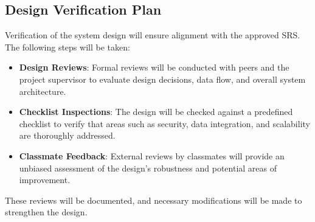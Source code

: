 \documentclass[12pt, titlepage]{article}
\begin{document}
\subsection{Design Verification Plan}
Verification of the system design will ensure alignment with the approved SRS. The following steps will be taken:
\begin{itemize}
    \item \textbf{Design Reviews}: Formal reviews will be conducted with peers and the project supervisor to evaluate design decisions, data flow, and overall system architecture.
    \item \textbf{Checklist Inspections}: The design will be checked against a predefined checklist to verify that areas such as security, data integration, and scalability are thoroughly addressed.
    \item \textbf{Classmate Feedback}: External reviews by classmates will provide an unbiased assessment of the design's robustness and potential areas of improvement.
\end{itemize}
These reviews will be documented, and necessary modifications will be made to strengthen the design.
\end{document}
